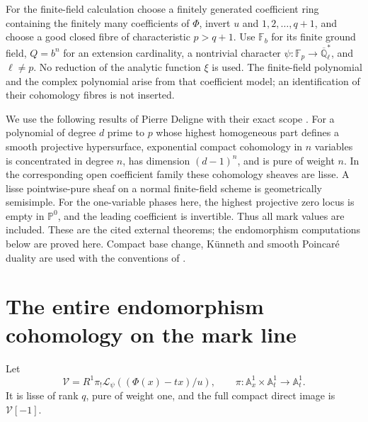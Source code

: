\documentclass[11pt]{article}
\renewcommand{\AA}{\mathbb A}
\newcommand{\QQl}{\overline{\mathbb Q}_\ell}
\begin{document}
For the finite-field calculation choose a finitely generated coefficient ring
containing the finitely many coefficients of $\Phi$, invert $u$ and
$1,2,\ldots,q+1$, and choose a good closed fibre of characteristic $p>q+1$.
Use $\mathbb F_b$ for its finite ground field, $Q=b^n$ for an extension
cardinality, a nontrivial character $\psi:\mathbb F_p\to\QQl^*$, and $\ell\ne p$.
No reduction of the analytic function $\xi$ is used. The finite-field
polynomial and the complex polynomial arise from that coefficient model; an
identification of their cohomology fibres is not inserted.

We use the following results of Pierre Deligne with their exact scope
\cite[\S3.7, (3.7.2.3), Lemma (3.7.3); (3.4.1)(iii)]{deligne}.
For a polynomial of degree $d$ prime to $p$ whose highest homogeneous part
defines a smooth projective hypersurface, exponential compact cohomology in
$n$ variables is concentrated in degree $n$, has dimension $(d-1)^n$, and is
pure of weight $n$. In the corresponding open coefficient family these
cohomology sheaves are lisse. A lisse pointwise-pure sheaf on a normal
finite-field scheme is geometrically semisimple. For the one-variable phases
here, the highest projective zero locus is empty in $\mathbb P^0$, and the
leading coefficient is invertible. Thus all mark values are included. These
are the cited external theorems; the endomorphism computations below are
proved here. Compact base change, K\"unneth and smooth Poincar\'e duality are
used with the conventions of \cite[\S1.4]{deligne}.

\section{The entire endomorphism cohomology on the mark line}
Let
\begin{equation}\tag{MII3}\label{mii:V}
 \mathcal V=R^1\pi_!\mathcal L_\psi((\Phi(x)-tx)/u),
 \qquad\pi:\AA_x^1\times\AA_t^1\longrightarrow\AA_t^1.
\end{equation}
It is lisse of rank $q$, pure of weight one, and the full compact direct image
is $\mathcal V[-1]$.
\end{document}
